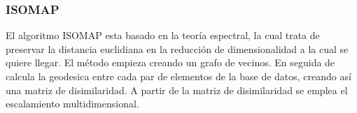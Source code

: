 \subsubsection{ISOMAP}

El algoritmo ISOMAP esta basado en la teoría espectral, la cual trata de preservar la distancia euclidiana en la reducción de dimensionalidad a la cual se quiere llegar. El método empieza creando un grafo de vecinos. En seguida de calcula la geodesica entre cada par de elementos de la base de datos, creando así una matriz de disimilaridad. A partir de la matriz de disimilaridad se emplea el escalamiento multidimensional.